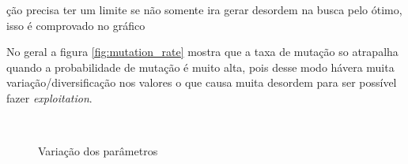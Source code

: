 \documentclass[11pt]{article}
\begin{document}
ção precisa ter um limite se não somente ira gerar desordem na busca pelo ótimo, isso é comprovado no gráfico

No geral a figura \ref{fig:mutation_rate} mostra que a taxa de mutação so atrapalha quando a probabilidade de mutação é muito alta, pois desse modo hávera muita variação/diversificação nos valores o que causa muita desordem para ser possível fazer \emph{exploitation}.

\begin{figure}[!htb]
	\centering
	~

	\caption{Variação dos parâmetros}

\end{figure}
\end{document}
